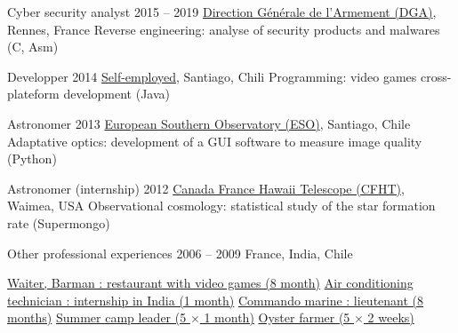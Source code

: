 \begin{joblist}[12.8][8.4][4]

\setlength{\parskip}{0.3cm}
\vspace{-0.4cm}

\item[Cyber security analyst]{2015 -- 2019}
  {
  \href{http://www.defense.gouv.fr/dga/}{Direction Générale de l'Armement (DGA)}, Rennes, France
  }
  {Reverse engineering: analyse of security products and malwares (C, Asm)}


\item[Developper]{2014}
  {
  \href{https://play.google.com/store/apps/developer?id=tinmarino&hl=en}{Self-employed}, Santiago, Chili
  }
  {Programming: video games cross-plateform development (Java)}


\item[Astronomer]{2013}
  {
  \href{http://www.eso.org/public/}{European Southern Observatory (ESO)}, Santiago, Chile
  }
  {Adaptative optics: development of a GUI software to measure image quality (Python)}


\item[Astronomer (internship)]{2012}
	{
\href{https://www.cfht.hawaii.edu/}{Canada France Hawaii Telescope (CFHT)}, Waimea, USA
  }
  {Observational cosmology: statistical study of the star formation rate (Supermongo)}

  
\item[Other professional experiences]{2006 -- 2009}
	{
	France, India, Chile
	}
	{
    \renewcommand\labelitemi{{}}
		\vspace{-0.8cm}
    \setlength{\parskip}{0cm}
		\begin{itemize}
		\setlength\itemsep{0cm}
  
    \cvitem \href{http://www.insertcoin.cl/}{ Waiter, Barman : restaurant with video games (8 month)}
    \cvitem \href{http://www.dupont.co.in/}{ Air conditioning technician : internship in India (1 month)}
    \cvitem \href{http://www.defense.gouv.fr/marine/organisation/forces/fusiliers-marins-et-commandos/force-maritime-des-fusiliers-marins-et-commandos}{ Commando marine : lieutenant (8 months)}
    \cvitem \href{http://www.vacances-pour-tous.org/}{ Summer camp leader (5 $\times$ 1 month)}
    \cvitem \href{http://huitresdesaintvaast.fr/}{ Oyster farmer (5 $\times$ 2 weeks)}
		\end{itemize}
  }

\end{joblist}


